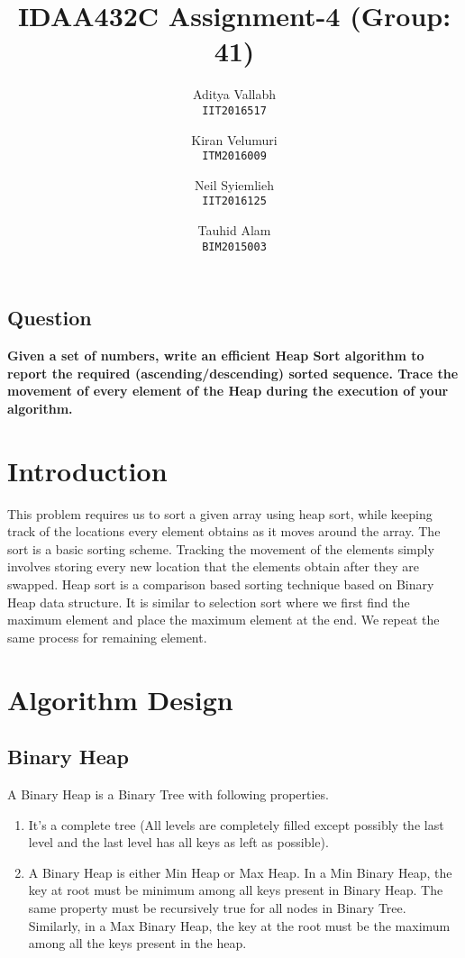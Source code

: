 \documentclass[letterpaper, 11 pt, conference]{ieeeconf}  %
\title{\LARGE 
IDAA432C Assignment-4 (Group: 41)
}
\author{
  Aditya Vallabh\\
  \texttt{IIT2016517}
  \and
  Kiran Velumuri\\
  \texttt{ITM2016009}
  \and
  Neil Syiemlieh\\
  \texttt{IIT2016125}
  \and
  Tauhid Alam\\
  \texttt{BIM2015003}
}
\begin{document}
\maketitle
\thispagestyle{empty}
\pagestyle{empty}



\subsection*{ \textbf{Question} }
\textbf{Given a set of numbers, write an efficient Heap Sort algorithm to report the required (ascending/descending) sorted sequence. Trace the movement of every element of the Heap during the execution of your algorithm. }


\section{Introduction}
This problem requires us to sort a given array using heap sort, while keeping track of the locations every element obtains as it moves around the array. The sort is a basic sorting scheme. Tracking the movement of the elements simply involves storing every new location that the elements obtain after they are swapped.
Heap sort is a comparison based sorting technique based on Binary Heap data structure. It is similar to selection sort where we first find the maximum element and place the maximum element at the end. We repeat the same process for remaining element.

\section{Algorithm Design}
\subsection{Binary Heap}
A Binary Heap is a Binary Tree with following properties.
\begin{enumerate}
\item It’s a complete tree (All levels are completely filled except possibly the last level and the last level has all keys as left as possible).

\item A Binary Heap is either Min Heap or Max Heap. In a Min Binary Heap, the key at root must be minimum among all keys present in Binary Heap. The same property must be recursively true for all nodes in Binary Tree. Similarly, in a Max Binary Heap, the key at the root must be the maximum among all the keys present in the heap.
\end{enumerate}
\end{document}
